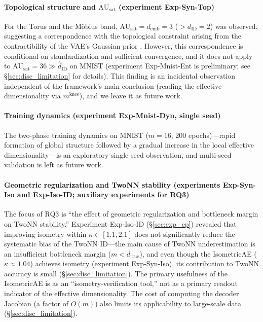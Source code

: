 \documentclass[make,article,submit,pdftex,moreauthors]{Definitions/mdpi}
\newcommand{\dID}{d_{\mathrm{ID}}}
\newcommand{\kap}{\kappa}
\newcommand{\AUsat}{\mathrm{AU}_{\mathrm{sat}}}
\newcommand{\mknee}{m^{\mathrm{knee}}}
\newcommand{\demb}{d_{\mathrm{emb}}}
\begin{document}
\paragraph{Topological structure and $\AUsat$ (experiment Exp-Syn-Top)}
For the Torus and the M\"obius band, $\AUsat = \demb = 3$ ($> \dID = 2$) was observed,
suggesting a correspondence with the topological constraint arising from the
contractibility of the VAE's Gaussian prior
\cite{hatcher2002algebraic,guillemin1974differential}.
However, this correspondence is conditional on standardization and sufficient
convergence, and it does not apply to $\AUsat = 36 \gg \hat{d}_\mathrm{ID}$ on MNIST
(experiment Exp-Mnist-Ent is preliminary; see \S\ref{sec:disc_limitation} for details).
This finding is an incidental observation independent of the framework's main
conclusion (reading the effective dimensionality via $\mknee$), and we leave it as
future work.

\paragraph{Training dynamics (experiment Exp-Mnist-Dyn, single seed)}
The two-phase training dynamics on MNIST ($m=16$, 200 epochs)---rapid formation of
global structure followed by a gradual increase in the local effective
dimensionality---is an exploratory single-seed observation, and multi-seed validation
is left as future work.

\paragraph{Geometric regularization and TwoNN stability (experiments Exp-Syn-Iso and Exp-Iso-ID; auxiliary experiments for RQ3)}
The focus of RQ3 is ``the effect of geometric regularization and bottleneck margin on
TwoNN stability.''
Experiment Exp-Iso-ID (\S\ref{sec:exp_ep}) revealed that improving isometry within
$\kap \in [1.1, 2.1]$ does not significantly reduce the systematic bias of the TwoNN
ID---the main cause of TwoNN underestimation is an insufficient bottleneck margin
($m < d_\mathrm{true}$), and even though the IsometricAE ($\kap \approx 1.04$) achieves
isometry (experiment Exp-Syn-Iso), its contribution to TwoNN accuracy is small
(\S\ref{sec:disc_limitation}).
The primary usefulness of the IsometricAE is as an ``isometry-verification tool,'' not
as a primary readout indicator of the effective dimensionality.
The cost of computing the decoder Jacobian (a factor of $O(m)$) also limits its
applicability to large-scale data (\S\ref{sec:disc_limitation}).
\end{document}
